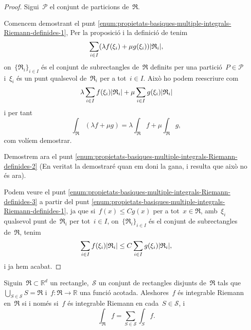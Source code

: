 \documentclass[../../main.tex]{subfiles}
\begin{document}
    \begin{proof}
        Sigui~\(\mathcal{P}\) el conjunt de particions de~\(\mathfrak{R}\).

        Comencem demostrant el punt \eqref{enum:propietats-basiques-multiple-integrals-Riemann-definides-1}, Per la proposició  i la definició de  tenim
        \[
            \sum_{i\in I}\left(\lambda f(\xi_{i})+\mu g(\xi_{i})\right)\abs{\mathfrak{R}_{i}},
        \]
        on~\(\{\mathfrak{R}_{i}\}_{i\in I}\) és el conjunt de subrectangles de~\(\mathfrak{R}\) definits per una partició~\(P\in\mathcal{P}\) i~\(\xi_{i}\) és un punt qualsevol de~\(\mathfrak{R}_{i}\) per a tot~\(i\in I\).
        Això ho podem reescriure com
        \[
            \lambda\sum_{i\in I}f(\xi_{i})\abs{\mathfrak{R}_{i}}+\mu\sum_{i\in I}g(\xi_{i})\abs{\mathfrak{R}_{i}}
        \]
        i per tant
        \[
            \int_{\mathfrak{R}}(\lambda f+\mu g)=\lambda\int_{\mathfrak{R}}f+\mu\int_{\mathfrak{R}}g,
        \]
        com volíem demostrar.

        Demostrem ara el punt \eqref{enum:propietats-basiques-multiple-integrals-Riemann-definides-2} (En veritat la demostraré quan em doni la gana, i resulta que això no és ara).

        Podem veure el punt \eqref{enum:propietats-basiques-multiple-integrals-Riemann-definides-3} a partir del punt \eqref{enum:propietats-basiques-multiple-integrals-Riemann-definides-1}, ja que si~\(f(x)\leq Cg(x)\) per a tot~\(x\in \mathfrak{R}\), amb~\(\xi_{i}\) qualsevol punt de~\(\mathfrak{R}_{i}\) per tot~\(i\in I\), on~\(\{\mathfrak{R}_{i}\}_{i\in I}\) és el conjunt de subrectangles de~\(\mathfrak{R}\), tenim
        \[
            \sum_{i\in I}f(\xi_{i})\abs{\mathfrak{R}_{i}}\leq C\sum_{i\in I}g(\xi_{i})\abs{\mathfrak{R}_{i}},
        \]
        i ja hem acabat.
    \end{proof}
    \begin{theorem}
        \label{thm:podem-partir-les-integrals-Riemann}
        Siguin~\({{\mathfrak{R}}}\subset\mathbb{R}^{d}\) un rectangle,~\(\mathcal{S}\) un conjunt de rectangles disjunts de~\(\mathfrak{R}\) tals que~\(\bigcup_{S\in\mathcal{S}}S=\mathfrak{R}\) i~\(f\colon\mathfrak{R}\to\mathbb{R}\) una funció acotada.
        Aleshores~\(f\) és integrable Riemann en~\(\mathfrak{R}\) si i només si~\(f\) és integrable Riemann en cada~\(S\in\mathcal{S}\), i
        \[
            \int_{\mathfrak{R}}f=\sum_{S\in\mathcal{S}}\int_{S}f.
        \]
    \end{theorem}
\end{document}
